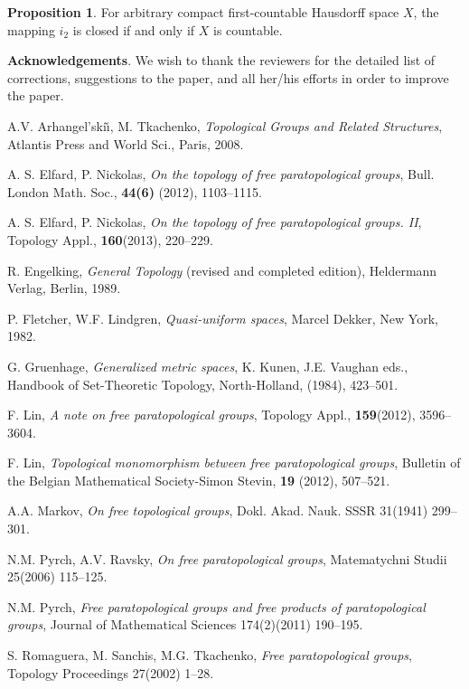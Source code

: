 \documentclass{amsart}
\theoremstyle{definition}
\newtheorem{proposition}[theorem]{Proposition}
\begin{document}
\begin{proposition}\label{p1}
For arbitrary compact first-countable Hausdorff space $X$, the mapping $i_{2}$ is closed if and only if $X$ is countable.
\end{proposition}

{\bf Acknowledgements}. We wish to thank
the reviewers for the detailed list of corrections, suggestions to the paper, and all her/his efforts
in order to improve the paper.

\begin{thebibliography}{99}
 A.V. Arhangel'ski\v{\i}, M. Tkachenko,
{\it Topological Groups and Related Structures}, Atlantis Press and
World Sci., Paris, 2008.

 A. S. Elfard, P. Nickolas,  {\it On the topology of free paratopological groups}, Bull. London Math. Soc., {\bf 44(6)} (2012), 1103--1115.

 A. S. Elfard, P. Nickolas,  {\it On the topology of free paratopological groups. II}, Topology Appl., {\bf 160}(2013), 220--229.

 R. Engelking, {\it General Topology} (revised and completed edition), Heldermann
Verlag, Berlin, 1989.

 P. Fletcher, W.F. Lindgren, {\it Quasi-uniform spaces}, Marcel Dekker, New York, 1982.

 G. Gruenhage, {\it Generalized metric spaces}, K. Kunen, J.E. Vaughan eds.,
Handbook of Set-Theoretic Topology, North-Holland, (1984), 423--501.

 F. Lin, {\it A note on free paratopological groups}, Topology Appl., {\bf 159}(2012), 3596--3604.

 F. Lin,  {\it Topological monomorphism between free paratopological groups},
Bulletin of the Belgian Mathematical Society-Simon Stevin, {\bf 19} (2012), 507--521.

 A.A. Markov, {\it On free topological groups},
Dokl. Akad. Nauk. SSSR 31(1941) 299--301.

 N.M. Pyrch, A.V. Ravsky, {\it On free paratopological groups},
Matematychni Studii 25(2006) 115--125.

 N.M. Pyrch, {\it Free paratopological groups and free products of paratopological groups}, Journal of Mathematical Sciences 174(2)(2011) 190--195.

 S. Romaguera, M. Sanchis, M.G. Tkachenko, {\it Free paratopological groups},
Topology Proceedings 27(2002) 1--28.
\end{thebibliography}
\end{document}
